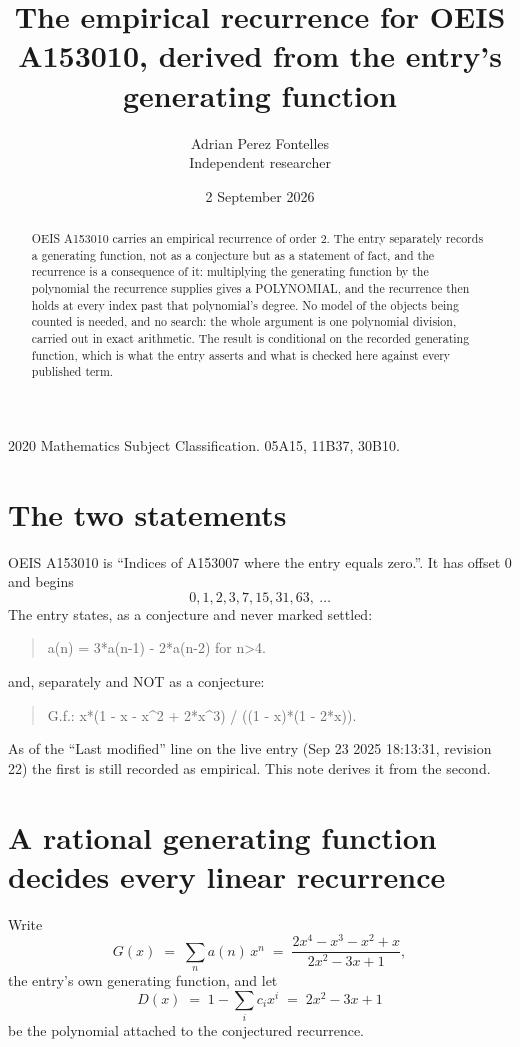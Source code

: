\documentclass[11pt,a4paper]{article}
\title{The empirical recurrence for OEIS A153010, derived from the entry's generating function}
\author{Adrian Perez Fontelles\\ \small Independent researcher}
\date{2 September 2026}
\theoremstyle{plain}
\theoremstyle{definition}
\begin{document}
\maketitle

\begin{abstract}
OEIS A153010 carries an empirical recurrence of order $2$. The entry separately records a
generating function, not as a conjecture but as a statement of fact, and the recurrence is a
consequence of it: multiplying the generating function by the polynomial the recurrence
supplies gives a POLYNOMIAL, and the recurrence then holds at every index past that
polynomial's degree. No model of the objects being counted is needed, and no search: the
whole argument is one polynomial division, carried out in exact arithmetic. The result is
conditional on the recorded generating function, which is what the entry asserts and what is
checked here against every published term.
\end{abstract}

\noindent\small 2020 Mathematics Subject Classification. 05A15, 11B37, 30B10.\normalsize

\section{The two statements}

OEIS A153010 is ``Indices of A153007 where the entry equals zero.''. It has offset $0$ and begins
\[
0, 1, 2, 3, 7, 15, 31, 63,\ \dots
\]
The entry states, as a conjecture and never marked settled:
\begin{quote}
a(n) = 3*a(n-1) - 2*a(n-2) for n>4.
\end{quote}
and, separately and NOT as a conjecture:
\begin{quote}
G.f.: x*(1 - x - x\^{}2 + 2*x\^{}3) / ((1 - x)*(1 - 2*x)).
\end{quote}
As of the ``Last modified'' line on the live entry (Sep 23 2025 18:13:31, revision 22) the first is still
recorded as empirical. This note derives it from the second.

\section{A rational generating function decides every linear recurrence}

Write
\[
G(x)\;=\;\sum_{n}a(n)\,x^{n}\;=\;\frac{2 x^{4} - x^{3} - x^{2} + x}{2 x^{2} - 3 x + 1},
\]
the entry's own generating function, and let
\[
D(x)\;=\;1-\sum_i c_i x^{i}\;=\;2 x^{2} - 3 x + 1
\]
be the polynomial attached to the conjectured recurrence.
\end{document}
